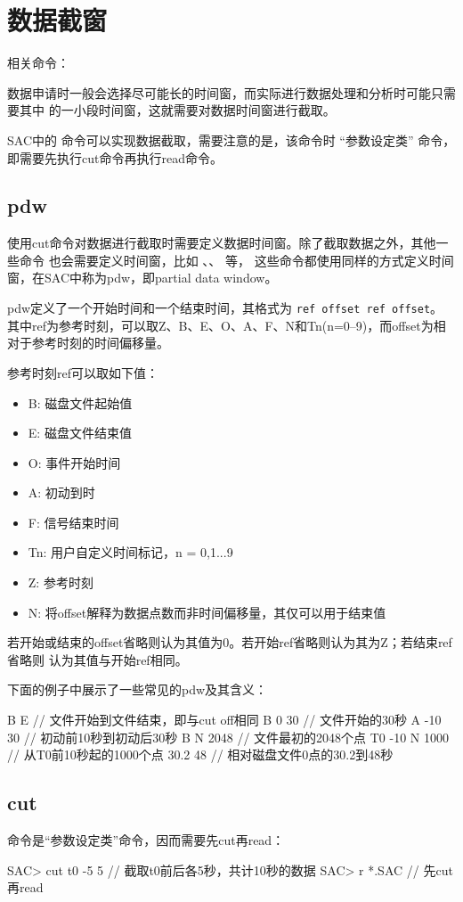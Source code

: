\section{数据截窗}
相关命令：

数据申请时一般会选择尽可能长的时间窗，而实际进行数据处理和分析时可能只需要其中
的一小段时间窗，这就需要对数据时间窗进行截取。

SAC中的  命令可以实现数据截取，需要注意的是，该命令时
``参数设定类'' 命令，即需要先执行cut命令再执行read命令。

\subsection{pdw}
\label{subsec:pdw}
使用cut命令对数据进行截取时需要定义数据时间窗。除了截取数据之外，其他一些命令
也会需要定义时间窗，比如 、、 等，
这些命令都使用同样的方式定义时间窗，在SAC中称为pdw，即partial data window。

pdw定义了一个开始时间和一个结束时间，其格式为 \texttt{ref offset ref offset}。
其中ref为参考时刻，可以取Z、B、E、O、A、F、N和Tn(n=0--9)，而offset为相对于参考时刻的时间偏移量。

参考时刻ref可以取如下值：
\begin{itemize}
\item B: 磁盘文件起始值
\item E: 磁盘文件结束值
\item O: 事件开始时间
\item A: 初动到时
\item F: 信号结束时间
\item Tn: 用户自定义时间标记，n = 0,1...9
\item Z: 参考时刻
\item N: 将offset解释为数据点数而非时间偏移量，其仅可以用于结束值
\end{itemize}

若开始或结束的offset省略则认为其值为0。若开始ref省略则认为其为Z；若结束ref省略则
认为其值与开始ref相同。

下面的例子中展示了一些常见的pdw及其含义：
\begin{SACCode}
 B E            // 文件开始到文件结束，即与cut off相同
 B 0 30         // 文件开始的30秒
 A -10 30       // 初动前10秒到初动后30秒
 B N 2048       // 文件最初的2048个点
 T0 -10 N 1000  // 从T0前10秒起的1000个点
 30.2 48        // 相对磁盘文件0点的30.2到48秒
\end{SACCode}

\subsection{cut}
命令是``参数设定类''命令，因而需要先cut再read：
\begin{SACCode}
SAC> cut t0 -5 5        // 截取t0前后各5秒，共计10秒的数据
SAC> r *.SAC            // 先cut再read
\end{SACCode}
